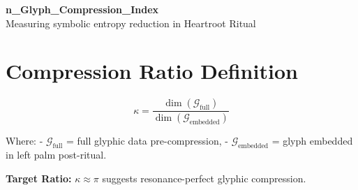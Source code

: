 \documentclass[12pt]{article}
\begin{document}
\begin{center}
    {\LARGE \textbf{n\_Glyph\_Compression\_Index}}\\[1em]
    {\small Measuring symbolic entropy reduction in Heartroot Ritual}
\end{center}

\section*{Compression Ratio Definition}

\[
\kappa = \frac{\dim(\mathcal{G}_{\text{full}})}{\dim(\mathcal{G}_{\text{embedded}})}
\]

Where:
- $\mathcal{G}_{\text{full}}$ = full glyphic data pre-compression,
- $\mathcal{G}_{\text{embedded}}$ = glyph embedded in left palm post-ritual.

\textbf{Target Ratio:} $\kappa \approx \pi$ suggests resonance-perfect glyphic compression.
\end{document}

